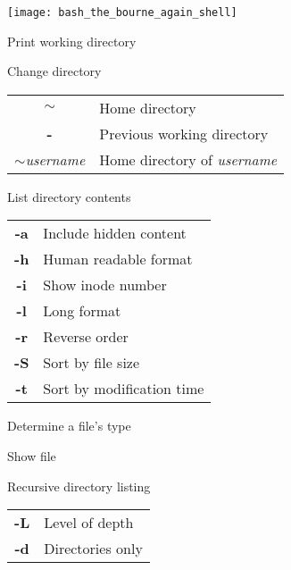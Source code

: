 \documentclass[12pt, a4paper]
{article}
\begin{document}
\pagestyle{empty}

\begin{center}
	\raisebox{1.4em}{\Huge \bfseries \ttfamily CHEAT SHEET:} \hspace{1em}  \texttt{[image: bash\_the\_bourne\_again\_shell]}
\end{center}
\vspace{0.25em}

\begin{multicols}{3}


\begin{description}[nolistsep]
	\item[pwd] Print working directory
	\item[cd] Change directory 
	\item
	\begin{tabular}{cl}
		{\large \ttfamily \textbf{$\sim$}} & Home directory \\
		{\large \ttfamily \textbf{-}} & Previous working directory \\
		{\large \ttfamily \textbf{$\sim$}\textit{username}} & Home directory of \textit{username}
	\end{tabular}
\end{description}


\begin{description}[nolistsep]
	\item[ls] List directory contents
	\item
	\begin{tabular}{cl}
		{\large \ttfamily \textbf{-a}} & Include hidden content \\
		{\large \ttfamily \textbf{-h}} & Human readable format\\
		{\large \ttfamily \textbf{-i}} & Show inode number\\
		{\large \ttfamily \textbf{-l}} & Long format \\
		{\large \ttfamily \textbf{-r}} & Reverse order \\
		{\large \ttfamily \textbf{-S}} & Sort by file size \\
		{\large \ttfamily \textbf{-t}} & Sort by modification time\\
	\end{tabular}
	\item[file] Determine a file's type
	\item[less] Show file
	\item[tree] Recursive  directory listing
	\item
	\begin{tabular}{cl}
		{\large \ttfamily \textbf{-L}} & Level of depth \\
		{\large \ttfamily \textbf{-d}} & Directories only\\
	\end{tabular}
\end{description}


\end{multicols}
\end{document}

